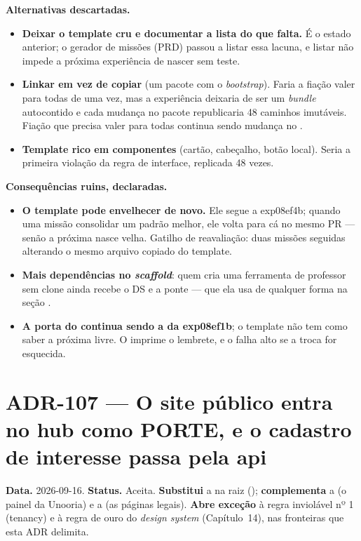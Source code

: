 \textbf{Alternativas descartadas.}

\begin{itemize}
  \item \textbf{Deixar o template cru e documentar a lista do que falta.} É o
    estado anterior; o gerador de missões (PRD) passou a listar essa lacuna, e
    listar não impede a próxima experiência de nascer sem teste.
  \item \textbf{Linkar em vez de copiar} (um pacote  com o
    \emph{bootstrap}). Faria a fiação valer para todas de uma vez, mas a
    experiência deixaria de ser um \emph{bundle} autocontido e cada mudança no
    pacote republicaria 48 caminhos imutáveis. Fiação que precisa valer para
    todas continua sendo mudança no .
  \item \textbf{Template rico em componentes} (cartão, cabeçalho, botão local).
    Seria a primeira violação da regra de interface, replicada 48 vezes.
\end{itemize}

\textbf{Consequências ruins, declaradas.}

\begin{itemize}
  \item \textbf{O template pode envelhecer de novo.} Ele segue a exp08ef4b; quando
    uma missão consolidar um padrão melhor, ele volta para cá no mesmo PR ---
    senão a próxima nasce velha. Gatilho de reavaliação: duas missões seguidas
    alterando o mesmo arquivo copiado do template.
  \item \textbf{Mais dependências no \emph{scaffold}}: quem cria uma
    ferramenta de professor sem clone ainda recebe o DS e a ponte --- que ela
    usa de qualquer forma na seção .
  \item \textbf{A porta  do  continua sendo a da exp08ef1b}; o
    template não tem como saber a próxima livre. O  imprime o
    lembrete, e o  falha alto se a troca for esquecida.
\end{itemize}

\section{ADR-107 --- O site público entra no hub como PORTE, e o cadastro de interesse passa pela api}
\label{adr:site-publico-e-prospeccao}

\textbf{Data.} 2026-09-16. \textbf{Status.} Aceita.
\textbf{Substitui} a  na raiz (\cd{/}); \textbf{complementa} a
 (o painel da Unooria) e a  (as páginas legais).
\textbf{Abre exceção} à regra inviolável nº 1 (tenancy) e à regra de ouro do
\emph{design system} (Capítulo~14), nas fronteiras que esta ADR delimita.


